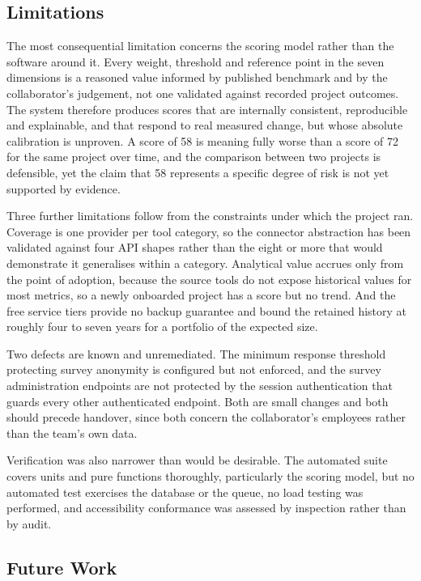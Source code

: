 \subsection{Limitations}
\label{subsec:conclusion-limitations}

The most consequential limitation concerns the scoring model rather than the
software around it. Every weight, threshold and reference point in the seven
dimensions is a reasoned value informed by published benchmark and by the
collaborator's judgement, not one validated against recorded project outcomes.
The system therefore produces scores that are internally consistent,
reproducible and explainable, and that respond to real measured change, but
whose absolute calibration is unproven. A score of 58 is meaning fully worse than
a score of 72 for the same project over time, and the comparison between two
projects is defensible, yet the claim that 58 represents a specific degree of
risk is not yet supported by evidence.

Three further limitations follow from the constraints under which the project
ran. Coverage is one provider per tool category, so the connector abstraction has
been validated against four API shapes rather than the eight or more that would
demonstrate it generalises within a category. Analytical value accrues only from
the point of adoption, because the source tools do not expose historical values
for most metrics, so a newly onboarded project has a score but no trend. And the
free service tiers provide no backup guarantee and bound the retained history at
roughly four to seven years for a portfolio of the expected size.

Two defects are known and unremediated. The minimum response threshold protecting
survey anonymity is configured but not enforced, and the survey administration
endpoints are not protected by the session authentication that guards every other
authenticated endpoint. Both are small changes and both should precede handover,
since both concern the collaborator's employees rather than the team's own data.

Verification was also narrower than would be desirable. The automated suite
covers units and pure functions thoroughly, particularly the scoring model, but
no automated test exercises the database or the queue, no load testing was
performed, and accessibility conformance was assessed by inspection rather than
by audit.

\subsection{Future Work}
\label{subsec:future-work}


